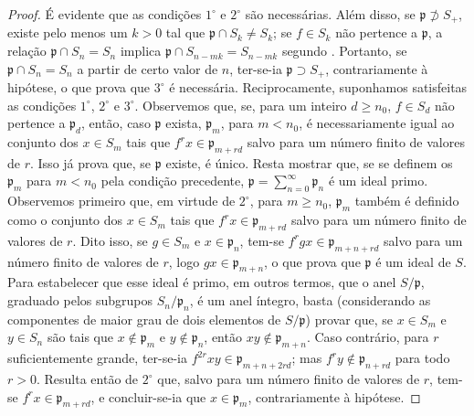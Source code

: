 \documentclass[oneside,10pt]{amsart}
\renewcommand{\geq}{\geqslant}
\newcommand{\oldpage}[2][]{\marginnote{\normalfont\footnotesize\textbf{#1}~|~#2}\ignorespaces}
\begin{document}
\begin{proof}
É evidente que as condições $1^\circ$ e $2^\circ$ são necessárias.
Além disso, se $\mathfrak{p}\not\supset S_+$, existe pelo menos um $k>0$ tal que $\mathfrak{p}\cap S_k\neq S_k$; se $f\in S_k$ não pertence a $\mathfrak{p}$, a relação $\mathfrak{p}\cap S_n=S_n$ implica $\mathfrak{p}\cap S_{n-mk}=S_{n-mk}$ segundo .
Portanto, se $\mathfrak{p}\cap S_n=S_n$ a partir de certo valor de $n$, ter-se-ia $\mathfrak{p}\supset S_+$, contrariamente à hipótese, o que prova que $3^\circ$ é necessária.
Reciprocamente, suponhamos satisfeitas as condições $1^\circ$, $2^\circ$ e $3^\circ$.
Observemos que, se, para um inteiro $d\geq n_0$, $f\in S_d$ não pertence a $\mathfrak{p}_d$, então, caso $\mathfrak{p}$ exista, $\mathfrak{p}_m$, para $m<n_0$, é necessariamente igual ao conjunto dos $x\in S_m$ tais que $f^rx\in\mathfrak{p}_{m+rd}$ salvo para um número finito de valores de $r$.
Isso já prova que, se $\mathfrak{p}$ existe, é único.
Resta mostrar que, se se definem os $\mathfrak{p}_m$ para $m<n_0$ pela condição precedente, $\mathfrak{p}=\sum_{n=0}^{\infty}\mathfrak{p}_n$ é um ideal primo.
Observemos primeiro que, em virtude de $2^\circ$, para $m\geq n_0$, $\mathfrak{p}_m$ também é definido como o conjunto dos $x\in S_m$ tais que $f^rx\in\mathfrak{p}_{m+rd}$ salvo para um número finito de valores de $r$.
Dito
\oldpage[II]{23}
isso, se $g\in S_m$ e $x\in\mathfrak{p}_n$, tem-se $f^rgx\in\mathfrak{p}_{m+n+rd}$ salvo para um número finito de valores de $r$, logo $gx\in\mathfrak{p}_{m+n}$, o que prova que $\mathfrak{p}$ é um ideal de $S$.
Para estabelecer que esse ideal é primo, em outros termos, que o anel $S/\mathfrak{p}$, graduado pelos subgrupos $S_n/\mathfrak{p}_n$, é um anel íntegro, basta (considerando as componentes de maior grau de dois elementos de $S/\mathfrak{p}$) provar que, se $x\in S_m$ e $y\in S_n$ são tais que $x\notin\mathfrak{p}_m$ e $y\notin\mathfrak{p}_n$, então $xy\notin\mathfrak{p}_{m+n}$.
Caso contrário, para $r$ suficientemente grande, ter-se-ia $f^{2r}xy\in\mathfrak{p}_{m+n+2rd}$; mas $f^ry\notin\mathfrak{p}_{n+rd}$ para todo $r>0$.
Resulta então de $2^\circ$ que, salvo para um número finito de valores de $r$, tem-se $f^rx\in\mathfrak{p}_{m+rd}$, e concluir-se-ia que $x\in\mathfrak{p}_m$, contrariamente à hipótese.
\end{proof}
\end{document}
